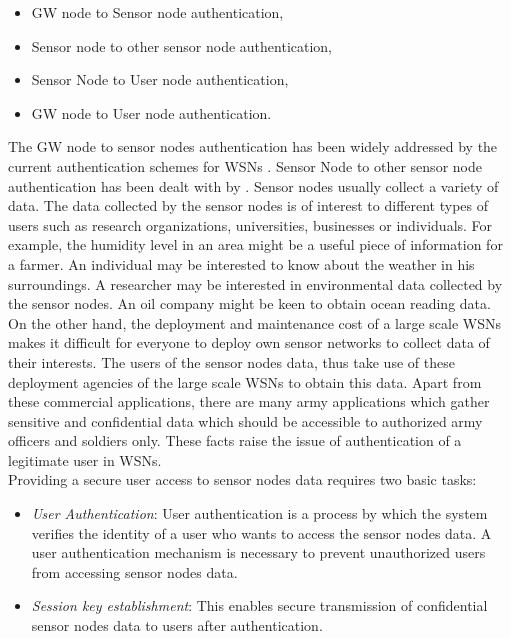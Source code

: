 \documentclass[a4paper,12pt]{report}
\begin{document}
\begin{itemize}
\item GW node to Sensor node authentication,
\item Sensor node to other sensor node authentication,
\item Sensor Node to User node authentication,
\item GW node to User node authentication.
\end{itemize}

The GW node to sensor nodes authentication has been widely addressed
by the current authentication schemes for WSNs
\cite{perrig,liu,liu2003,drissi,cao}. Sensor Node to other sensor
node authentication has been dealt with by \cite{yasmin}. Sensor
nodes usually collect a variety of data. The data collected by the
sensor nodes is of interest to different types of users such as
research organizations, universities, businesses or individuals. For
example, the humidity level in an area might be a useful piece of
information for a farmer. An individual may be interested to know
about the weather in his surroundings. A researcher may be
interested in environmental data collected by the sensor nodes. An
oil company might be keen to obtain ocean reading data. On the other
hand, the deployment and maintenance cost of a large scale WSNs
makes it difficult for everyone to deploy own sensor networks to
collect data of their interests. The users of the sensor nodes data,
thus take use of these deployment agencies of the large scale WSNs
to obtain this data. Apart from these commercial applications, there
are many army applications which gather sensitive and confidential
data which should be accessible to authorized army officers and
soldiers only. These facts raise the issue of authentication of a
legitimate user in WSNs.\\

Providing a secure user access to sensor nodes data requires two
basic tasks:

\begin{itemize}
\item \textit{User Authentication}: User authentication is a process
by which the system verifies the identity of a user who wants to
access the sensor nodes data. A user authentication mechanism is
necessary to prevent unauthorized users from accessing sensor nodes
data.

\item \textit{Session key establishment}: This enables secure transmission
of confidential sensor nodes data to users after authentication.
\end{itemize}
\end{document}
